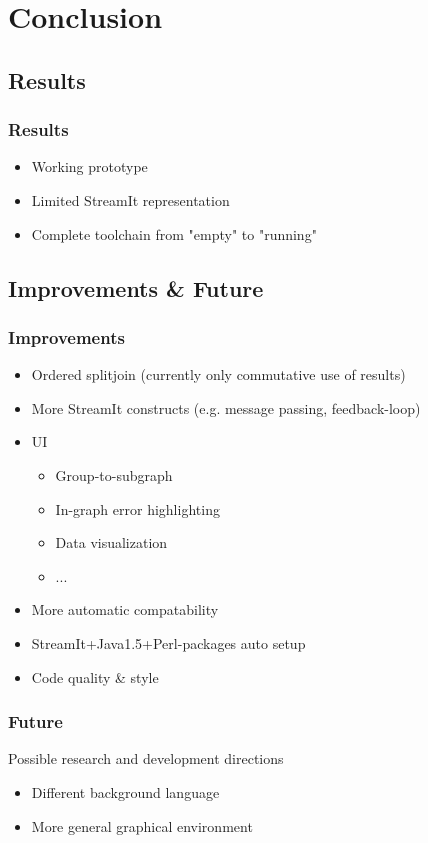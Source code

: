 \documentclass{beamer}
\begin{document}
\section{Conclusion}

\subsection{Results}
\begin{frame}
\frametitle{Results}
	\begin{itemize}
		\item Working prototype
		\item Limited StreamIt representation
		\item Complete toolchain from "empty" to "running"
	\end{itemize}
\end{frame}

\subsection{Improvements \& Future}
\begin{frame}
\frametitle{Improvements}
	\begin{itemize}
		\item Ordered splitjoin (currently only commutative use of results)
		\item More StreamIt constructs (e.g. message passing, feedback-loop)
		\item UI
		\begin{itemize}
			\item Group-to-subgraph
			\item In-graph error highlighting
			\item Data visualization
			\item ...
		\end{itemize}
		\item More automatic compatability
		\item StreamIt+Java1.5+Perl-packages auto setup
		\item Code quality \& style
	\end{itemize}
\end{frame}

\begin{frame}
\frametitle{Future}
Possible research and development directions
	\begin{itemize}
		\item Different background language
		\item More general graphical environment
	\end{itemize}
\end{frame}
\end{document}
